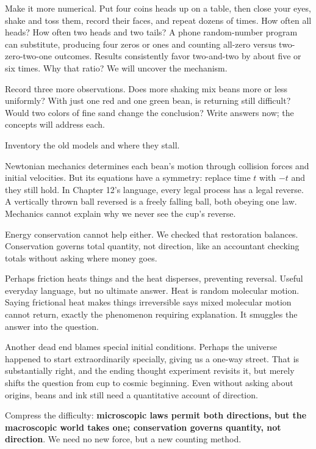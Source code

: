 Make it more numerical. Put four coins heads up on a table, then close your eyes, shake and toss them, record their faces, and repeat dozens of times. How often all heads? How often two heads and two tails? A phone random-number program can substitute, producing four zeros or ones and counting all-zero versus two-zero-two-one outcomes. Results consistently favor two-and-two by about five or six times. Why that ratio? We will uncover the mechanism.

Record three more observations. Does more shaking mix beans more or less uniformly? With just one red and one green bean, is returning still difficult? Would two colors of fine sand change the conclusion? Write answers now; the concepts will address each.


Inventory the old models and where they stall.

Newtonian mechanics determines each bean's motion through collision forces and initial velocities. But its equations have a symmetry: replace time \(t\) with \(-t\) and they still hold. In Chapter 12's language, every legal process has a legal reverse. A vertically thrown ball reversed is a freely falling ball, both obeying one law. Mechanics cannot explain why we never see the cup's reverse.

Energy conservation cannot help either. We checked that restoration balances. Conservation governs total quantity, not direction, like an accountant checking totals without asking where money goes.

Perhaps friction heats things and the heat disperses, preventing reversal. Useful everyday language, but no ultimate answer. Heat is random molecular motion. Saying frictional heat makes things irreversible says mixed molecular motion cannot return, exactly the phenomenon requiring explanation. It smuggles the answer into the question.

Another dead end blames special initial conditions. Perhaps the universe happened to start extraordinarily specially, giving us a one-way street. That is substantially right, and the ending thought experiment revisits it, but merely shifts the question from cup to cosmic beginning. Even without asking about origins, beans and ink still need a quantitative account of direction.

\begin{mainline}
Compress the difficulty: \textbf{microscopic laws permit both directions, but the macroscopic world takes one; conservation governs quantity, not direction}. We need no new force, but a new counting method.
\end{mainline}

